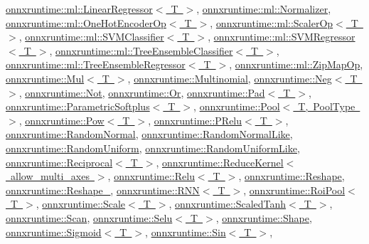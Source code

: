 \mbox{\hyperlink{classonnxruntime_1_1ml_1_1LinearRegressor}{onnxruntime\+::ml\+::\+Linear\+Regressor$<$ T $>$}}, \mbox{\hyperlink{classonnxruntime_1_1ml_1_1Normalizer}{onnxruntime\+::ml\+::\+Normalizer}}, \mbox{\hyperlink{classonnxruntime_1_1ml_1_1OneHotEncoderOp}{onnxruntime\+::ml\+::\+One\+Hot\+Encoder\+Op$<$ T $>$}}, \mbox{\hyperlink{classonnxruntime_1_1ml_1_1ScalerOp}{onnxruntime\+::ml\+::\+Scaler\+Op$<$ T $>$}}, \mbox{\hyperlink{classonnxruntime_1_1ml_1_1SVMClassifier}{onnxruntime\+::ml\+::\+S\+V\+M\+Classifier$<$ T $>$}}, \mbox{\hyperlink{classonnxruntime_1_1ml_1_1SVMRegressor}{onnxruntime\+::ml\+::\+S\+V\+M\+Regressor$<$ T $>$}}, \mbox{\hyperlink{classonnxruntime_1_1ml_1_1TreeEnsembleClassifier}{onnxruntime\+::ml\+::\+Tree\+Ensemble\+Classifier$<$ T $>$}}, \mbox{\hyperlink{classonnxruntime_1_1ml_1_1TreeEnsembleRegressor}{onnxruntime\+::ml\+::\+Tree\+Ensemble\+Regressor$<$ T $>$}}, \mbox{\hyperlink{classonnxruntime_1_1ml_1_1ZipMapOp}{onnxruntime\+::ml\+::\+Zip\+Map\+Op}}, \mbox{\hyperlink{classonnxruntime_1_1Mul}{onnxruntime\+::\+Mul$<$ T $>$}}, \mbox{\hyperlink{classonnxruntime_1_1Multinomial}{onnxruntime\+::\+Multinomial}}, \mbox{\hyperlink{classonnxruntime_1_1Neg}{onnxruntime\+::\+Neg$<$ T $>$}}, \mbox{\hyperlink{classonnxruntime_1_1Not}{onnxruntime\+::\+Not}}, \mbox{\hyperlink{classonnxruntime_1_1Or}{onnxruntime\+::\+Or}}, \mbox{\hyperlink{structonnxruntime_1_1Pad}{onnxruntime\+::\+Pad$<$ T $>$}}, \mbox{\hyperlink{classonnxruntime_1_1ParametricSoftplus}{onnxruntime\+::\+Parametric\+Softplus$<$ T $>$}}, \mbox{\hyperlink{classonnxruntime_1_1Pool}{onnxruntime\+::\+Pool$<$ T, Pool\+Type $>$}}, \mbox{\hyperlink{classonnxruntime_1_1Pow}{onnxruntime\+::\+Pow$<$ T $>$}}, \mbox{\hyperlink{classonnxruntime_1_1PRelu}{onnxruntime\+::\+P\+Relu$<$ T $>$}}, \mbox{\hyperlink{classonnxruntime_1_1RandomNormal}{onnxruntime\+::\+Random\+Normal}}, \mbox{\hyperlink{classonnxruntime_1_1RandomNormalLike}{onnxruntime\+::\+Random\+Normal\+Like}}, \mbox{\hyperlink{classonnxruntime_1_1RandomUniform}{onnxruntime\+::\+Random\+Uniform}}, \mbox{\hyperlink{classonnxruntime_1_1RandomUniformLike}{onnxruntime\+::\+Random\+Uniform\+Like}}, \mbox{\hyperlink{classonnxruntime_1_1Reciprocal}{onnxruntime\+::\+Reciprocal$<$ T $>$}}, \mbox{\hyperlink{classonnxruntime_1_1ReduceKernel}{onnxruntime\+::\+Reduce\+Kernel$<$ allow\+\_\+multi\+\_\+axes $>$}}, \mbox{\hyperlink{classonnxruntime_1_1Relu}{onnxruntime\+::\+Relu$<$ T $>$}}, \mbox{\hyperlink{classonnxruntime_1_1Reshape}{onnxruntime\+::\+Reshape}}, \mbox{\hyperlink{classonnxruntime_1_1Reshape__1}{onnxruntime\+::\+Reshape\+\_}}, \mbox{\hyperlink{classonnxruntime_1_1RNN}{onnxruntime\+::\+R\+N\+N$<$ T $>$}}, \mbox{\hyperlink{classonnxruntime_1_1RoiPool}{onnxruntime\+::\+Roi\+Pool$<$ T $>$}}, \mbox{\hyperlink{classonnxruntime_1_1Scale}{onnxruntime\+::\+Scale$<$ T $>$}}, \mbox{\hyperlink{classonnxruntime_1_1ScaledTanh}{onnxruntime\+::\+Scaled\+Tanh$<$ T $>$}}, \mbox{\hyperlink{classonnxruntime_1_1Scan}{onnxruntime\+::\+Scan}}, \mbox{\hyperlink{classonnxruntime_1_1Selu}{onnxruntime\+::\+Selu$<$ T $>$}}, \mbox{\hyperlink{classonnxruntime_1_1Shape}{onnxruntime\+::\+Shape}}, \mbox{\hyperlink{classonnxruntime_1_1Sigmoid}{onnxruntime\+::\+Sigmoid$<$ T $>$}}, \mbox{\hyperlink{classonnxruntime_1_1Sin}{onnxruntime\+::\+Sin$<$ T $>$}}, 